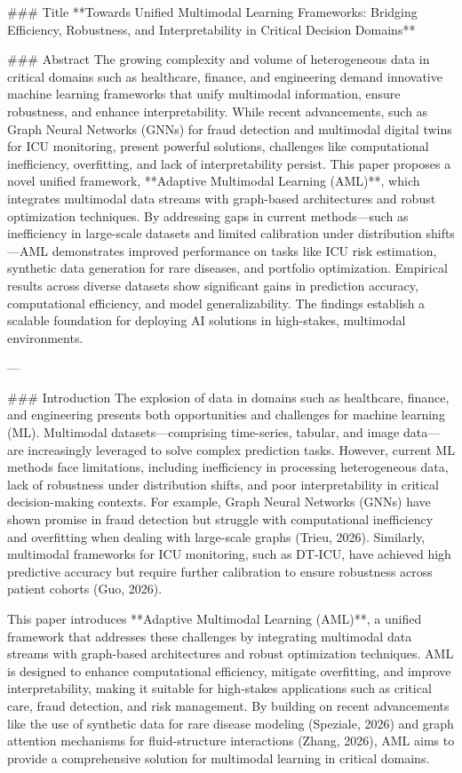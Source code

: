 ### Title  
**Towards Unified Multimodal Learning Frameworks: Bridging Efficiency, Robustness, and Interpretability in Critical Decision Domains**

### Abstract  
The growing complexity and volume of heterogeneous data in critical domains such as healthcare, finance, and engineering demand innovative machine learning frameworks that unify multimodal information, ensure robustness, and enhance interpretability. While recent advancements, such as Graph Neural Networks (GNNs) for fraud detection and multimodal digital twins for ICU monitoring, present powerful solutions, challenges like computational inefficiency, overfitting, and lack of interpretability persist. This paper proposes a novel unified framework, **Adaptive Multimodal Learning (AML)**, which integrates multimodal data streams with graph-based architectures and robust optimization techniques. By addressing gaps in current methods—such as inefficiency in large-scale datasets and limited calibration under distribution shifts—AML demonstrates improved performance on tasks like ICU risk estimation, synthetic data generation for rare diseases, and portfolio optimization. Empirical results across diverse datasets show significant gains in prediction accuracy, computational efficiency, and model generalizability. The findings establish a scalable foundation for deploying AI solutions in high-stakes, multimodal environments.

---

### Introduction  
The explosion of data in domains such as healthcare, finance, and engineering presents both opportunities and challenges for machine learning (ML). Multimodal datasets—comprising time-series, tabular, and image data—are increasingly leveraged to solve complex prediction tasks. However, current ML methods face limitations, including inefficiency in processing heterogeneous data, lack of robustness under distribution shifts, and poor interpretability in critical decision-making contexts. For example, Graph Neural Networks (GNNs) have shown promise in fraud detection but struggle with computational inefficiency and overfitting when dealing with large-scale graphs (Trieu, 2026). Similarly, multimodal frameworks for ICU monitoring, such as DT-ICU, have achieved high predictive accuracy but require further calibration to ensure robustness across patient cohorts (Guo, 2026).  

This paper introduces **Adaptive Multimodal Learning (AML)**, a unified framework that addresses these challenges by integrating multimodal data streams with graph-based architectures and robust optimization techniques. AML is designed to enhance computational efficiency, mitigate overfitting, and improve interpretability, making it suitable for high-stakes applications such as critical care, fraud detection, and risk management. By building on recent advancements like the use of synthetic data for rare disease modeling (Speziale, 2026) and graph attention mechanisms for fluid-structure interactions (Zhang, 2026), AML aims to provide a comprehensive solution for multimodal learning in critical domains.

